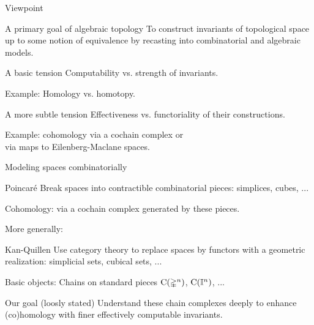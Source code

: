 
\begin{frame}{Viewpoint}
	\vskip -10pt
	\begin{block}{A primary goal of algebraic topology}
		To construct invariants of topological space up to some notion of equivalence by recasting into combinatorial and algebraic models.
	\end{block}

	\medskip\pause
	\begin{block}{A basic tension}
		Computability vs. strength of invariants.
	\end{block}

	\medskip \textcolor{pblue}{Example:}
	Homology vs. homotopy.

	\medskip\pause
	\begin{block}{A more subtle tension}
		Effectiveness vs. functoriality of their constructions.
	\end{block}

	\medskip \textcolor{pblue}{Example:}
	cohomology via a cochain complex or \\
	\hspace*{40pt} via maps to Eilenberg-Maclane spaces.
\end{frame}

\begin{frame}{Modeling spaces combinatorially}
	\pause
	\begin{block}{Poincar\'{e}}
		Break spaces into contractible combinatorial pieces: simplices, cubes, ...
	\end{block}

	\pause \textcolor{pblue}{Cohomology:}
	via a cochain complex generated by these pieces.

	\medskip\pause	More generally:
	\begin{block}{Kan-Quillen}
		Use category theory to replace spaces by functors with a geometric realization: simplicial sets, cubical sets, ...
	\end{block}

	\pause \textcolor{pblue}{Basic objects:}
	Chains on standard pieces $\operatorname{C}(\mathbb{\Delta}^n)$, $\operatorname{C}(\mathbb{I}^n)$, ...

	\smallskip\pause
	\begin{block}{Our goal (loosly stated)}
		Understand these chain complexes deeply to enhance (co)homology with finer effectively computable invariants.
	\end{block}
\end{frame}

